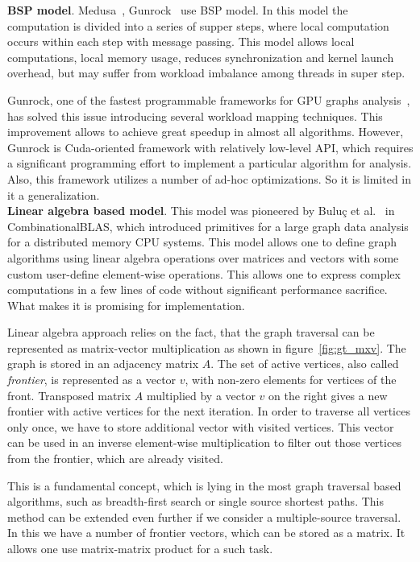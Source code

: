 \textbf{BSP model}. Medusa~\cite{article:medusa}, Gunrock~\cite{article:gunrock} use BSP model. In this model the computation is divided into a series of supper steps, where local computation occurs within each step with message passing. This model allows local computations, local memory usage, reduces synchronization and kernel launch overhead, but may suffer from workload imbalance among threads in super step.

Gunrock, one of the fastest programmable frameworks for GPU graphs analysis~\cite{article:shi_survey_graphs},  has solved this issue introducing several workload mapping techniques. This improvement allows to achieve great speedup in almost all algorithms. However, Gunrock is Cuda-oriented framework with relatively low-level API, which requires a significant programming effort to implement a particular algorithm for analysis. Also, this framework utilizes a number of ad-hoc optimizations. So it is limited in it a generalization.\\

\textbf{Linear algebra based model}. This model was pioneered by Buluç et al.~\cite{article:combblas} in CombinationalBLAS, which introduced primitives for a large graph data analysis for a distributed memory CPU systems. This model allows one to define graph algorithms using linear algebra operations over matrices and vectors with some custom user-define element-wise operations. This allows one to express complex computations in a few lines of code without significant performance sacrifice. What makes it is promising for implementation. 

Linear algebra approach relies on the fact, that the graph traversal can be represented as matrix-vector multiplication as shown in figure~\ref{fig:gt_mxv}. The graph is stored in an adjacency matrix $A$. The set of active vertices, also called \textit{frontier}, is represented as a vector $v$, with non-zero elements for vertices of the front. Transposed matrix $A$ multiplied by a vector $v$ on the right gives a new frontier with active vertices for the next iteration. In order to traverse all vertices only once, we have to store additional vector with visited vertices. This vector can be used in an inverse element-wise multiplication to filter out those vertices from the frontier, which are already visited. 

This is a fundamental concept, which is lying in the most graph traversal based algorithms, such as breadth-first search or single source shortest paths. This method can be extended even further if we consider a multiple-source traversal. In this we have a number of frontier vectors, which can be stored as a matrix. It allows one use matrix-matrix product for a such task.

